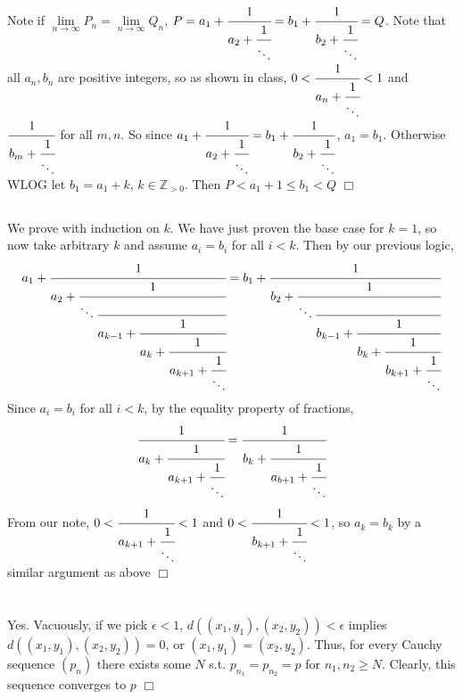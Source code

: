 \documentclass{article}
\begin{document}
\section{}
\subsection{}
Note if $\lim\limits_{n\rightarrow \infty} P_n = \lim\limits_{n\rightarrow \infty} Q_n$, $P = a_1 + \cfrac{1}{a_2 + \cfrac{1}{\ddots}} = b_1 + \cfrac{1}{b_2 + \cfrac{1}{\ddots}} = Q$. Note that all $a_n, b_n$ are positive integers, so as shown in class, $0 < \cfrac{1}{a_n + \cfrac{1}{\ddots}} < 1$ and $\cfrac{1}{b_m + \cfrac{1}{\ddots}}$ for all $m,n$. So since $a_1 + \cfrac{1}{a_2 + \cfrac{1}{\ddots}} = b_1 + \cfrac{1}{b_2 + \cfrac{1}{\ddots}}$, $a_1 = b_1$. Otherwise WLOG let $b_1 = a_1 + k$, $k \in \mathbb{Z}_{>0}$. Then $P < a_1 + 1 \leq b_1 < Q$ $\Box$

\subsection{}
We prove with induction on $k$. We have just proven the base case for $k = 1$, so now take arbitrary $k$ and assume $a_i = b_i$ for all $i < k$. Then by our previous logic,
$$a_1 + \cfrac{1}{a_2 + \cfrac{1}{\ddots \cfrac{}{a_{k-1} + \cfrac{1}{a_k + \cfrac{1}{a_{k+1} + \cfrac{1}{\ddots}}}}}} = b_1 + \cfrac{1}{b_2 + \cfrac{1}{\ddots \cfrac{}{b_{k-1} + \cfrac{1}{b_k + \cfrac{1}{b_{k+1} + \cfrac{1}{\ddots}}}}}}$$
Since $a_i = b_i$ for all $i<k$, by the equality property of fractions,
$$\cfrac{1}{a_k + \cfrac{1}{a_{k+1} + \cfrac{1}{\ddots}}} = \cfrac{1}{b_k + \cfrac{1}{a_{b+1} + \cfrac{1}{\ddots}}}$$
From our note, $0 < \cfrac{1}{a_{k+1} + \cfrac{1}{\ddots}} < 1$ and $0 < \cfrac{1}{b_{k+1} + \cfrac{1}{\ddots}} < 1$, so $a_k = b_k$ by a similar argument as above $\Box$


\section{}
\subsection{}
Yes. Vacuously, if we pick $\epsilon <1$, $d((x_1,y_1),(x_2,y_2)) < \epsilon$ implies $d((x_1,y_1),(x_2,y_2)) = 0$, or $(x_1,y_1)=(x_2,y_2)$. Thus, for every Cauchy sequence $(p_n)$ there exists some $N$ s.t. $p_{n_1} = p_{n_2} = p$ for $n_1,n_2 \geq N$. Clearly, this sequence converges to $p$ $\Box$
\end{document}
